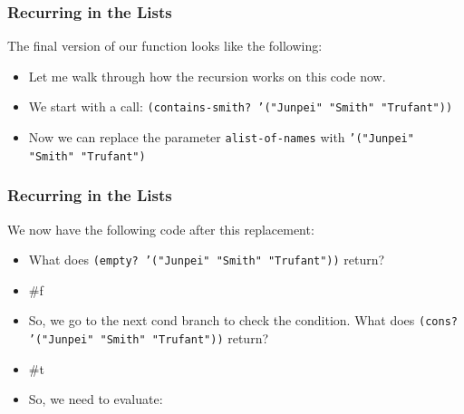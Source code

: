 \documentclass{beamer}
\begin{document}

\begin{frame}
  \frametitle{Recurring in the Lists}
  The final version of our function looks like the following:
  \CheckSmithFinal

  \begin{itemize}
  \item<2-> Let me walk through how the recursion works on this code now.
  \item<3-> We start with a call: \texttt{(contains-smith? '("Junpei" "Smith" "Trufant"))}
  \item<4-> Now we can replace the parameter \texttt{alist-of-names} with \texttt{'("Junpei" "Smith" "Trufant")}  
  \end{itemize}
\end{frame}




\begin{frame}
  \frametitle{Recurring in the Lists}
  We now have the following code after this replacement:
  \CheckSmithSubOne

  \begin{itemize}
  \item<2-> What does \texttt{(empty? '("Junpei" "Smith" "Trufant"))} return?
  \item<3-> \#f
  \item<4-> So, we go to the next cond branch to check the condition. What does \texttt{(cons? '("Junpei" "Smith" "Trufant"))} return?
  \item<5-> \#t
  \item<6-> So, we need to evaluate:
    \ContainsElse
    
  \end{itemize}
\end{frame}
\end{document}
